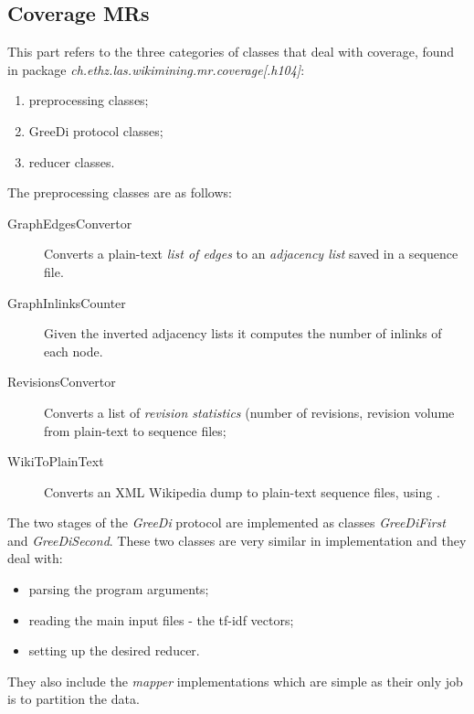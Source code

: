 \subsection{Coverage \aclp{MR}}

This part refers to the three categories of classes that deal with coverage,
found in package \emph{ch.ethz.las.wikimining.mr.coverage[.h104]}:
\begin{enumerate}
  \item preprocessing classes;
  \item GreeDi protocol classes;
  \item reducer classes.
\end{enumerate}

The preprocessing classes are as follows:
\begin{description}
  \item[GraphEdgesConvertor] Converts a plain-text \emph{list of edges} to an
  \emph{adjacency list} saved in a sequence file.
  \item[GraphInlinksCounter] Given the inverted adjacency lists it computes the
  number of inlinks of each node.
  \item[RevisionsConvertor] Converts a list of \emph{revision statistics}
  (number of revisions, revision volume from plain-text to sequence files;
  \item[WikiToPlainText] Converts an \ac{XML} Wikipedia dump to plain-text
  sequence files, using \cloud.
\end{description}

The two stages of the \emph{GreeDi} protocol are implemented as classes
\emph{GreeDiFirst} and \emph{GreeDiSecond}. These two classes are very similar
in implementation and they deal with:
\begin{itemize}
  \item parsing the program arguments;
  \item reading the main input files - the tf-idf vectors;
  \item setting up the desired reducer.
\end{itemize}
They also include the \emph{mapper} implementations which are simple as their
only job is to partition the data.

